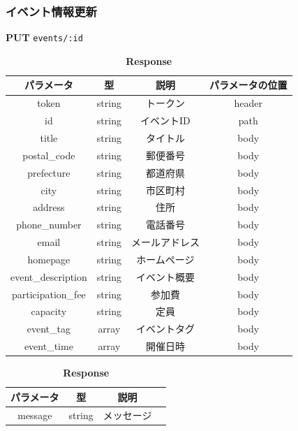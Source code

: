 \subsubsection*{イベント情報更新}
\textbf{PUT} \texttt{events/:id}
\begin{table}[H]
  \begin{minipage}
    {0.5\hsize} \centering \captionsetup{labelformat=empty,labelsep=none}
    \caption{\textbf{Request}}
    \small
    \begin{tabular}{|c|c|c|c|} \hline
      パラメータ              & 型      & 説明      & パラメータの位置 \\ \hline \hline
      token              & string & トークン    & header   \\ \hline
      id                 & string & イベントID  & path     \\ \hline
      title              & string & タイトル    & body     \\ \hline
      postal\_code       & string & 郵便番号    & body     \\ \hline
      prefecture         & string & 都道府県    & body     \\ \hline
      city               & string & 市区町村    & body     \\ \hline
      address            & string & 住所      & body     \\ \hline
      phone\_number      & string & 電話番号    & body     \\ \hline
      email              & string & メールアドレス & body     \\ \hline
      homepage           & string & ホームページ  & body     \\ \hline
      event\_description & string & イベント概要  & body     \\ \hline
      participation\_fee & string & 参加費     & body     \\ \hline
      capacity           & string & 定員      & body     \\ \hline
      event\_tag         & array  & イベントタグ  & body     \\ \hline
      event\_time        & array  & 開催日時    & body     \\ \hline
    \end{tabular}
  \end{minipage}
  \begin{minipage}
    {0.5\hsize} \centering \captionsetup{labelformat=empty,labelsep=none}
    \caption{\textbf{Response}}
    \begin{tabular}{|c|c|c|c|} \hline
      パラメータ   & 型      & 説明    \\ \hline \hline
      message & string & メッセージ \\ \hline
    \end{tabular}
  \end{minipage}
\end{table}


